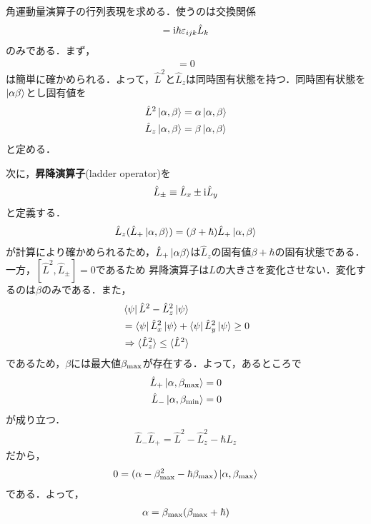 \documentclass{report}
\begin{document}
角運動量演算子の行列表現を求める．使うのは交換関係
\begin{align}
  [\hat{L}_i,\hat{L}_j] = \i\hbar\epsilon_{ijk}\hat{L}_k \label{commutation-of-am}
\end{align}
のみである．まず，
\begin{align}
  [\hat{L}^2, \hat{L}_i] = 0
\end{align}
は簡単に確かめられる．よって，$\hat{L}^2$と$\hat{L}_z$は同時固有状態を持つ．同時固有状態を$\ket{\alpha\beta}$とし固有値を
\begin{align}
  \hat{L}^2\ket{\alpha,\beta} &= \alpha\ket{\alpha,\beta}\\
  \hat{L}_z\ket{\alpha,\beta} &= \beta\ket{\alpha,\beta}
\end{align}
と定める．

次に，\textbf{昇降演算子}(ladder operator)を
\begin{align}
  \hat{L}_{\pm} \equiv \hat{L}_x \pm \mathrm{i} \hat{L}_y
\end{align}
と定義する．
\begin{align}
  \hat{L}_z(\hat{L}_{+}\ket{\alpha,\beta}) = (\beta + \hbar)\hat{L}_{+}\ket{\alpha,\beta}
\end{align}
が計算により確かめられるため，$\hat{L}_{+}\ket{\alpha\beta}$は$\hat{L}_z$の固有値$\beta+\hbar$の固有状態である．一方，$[\hat{L}^2, \hat{L}_{\pm}]=0$であるため
昇降演算子は$L$の大きさを変化させない．変化するのは$\beta$のみである．また，
\begin{align}
  &\bra{\psi}\hat{L}^2 - \hat{L}_z^2 \ket{\psi}\\
  &= \bra{\psi}\hat{L}_x^2\ket{\psi} + \bra{\psi}\hat{L}_y^2\ket{\psi} \geq 0\\
  &\Rightarrow \langle \hat{L}_z^2 \rangle \leq \langle \hat{L}^2 \rangle
\end{align}
であるため，$\beta$には最大値$\beta_{\mathrm{max}}$が存在する．よって，あるところで
\begin{align}
  \hat{L}_{+}\ket{\alpha,\beta_{\mathrm{max}}} &= 0\\
  \hat{L}_{-}\ket{\alpha,\beta_{\mathrm{min}}} &= 0
\end{align}
が成り立つ．
\begin{align}
  \hat{L}_{-}\hat{L}_{+} = \hat{L}^2 - \hat{L}_z^2 - \hbar \hat{L}_z
\end{align}
だから，
\begin{align}
  0 = (\alpha - \beta_{\mathrm{max}}^2 - \hbar \beta_{\mathrm{\max}})\ket{\alpha,\beta_{\mathrm{max}}}
\end{align}
である．よって，
\begin{align}
  \alpha = \beta_{\mathrm{max}}(\beta_{\mathrm{max}} + \hbar)
\end{align}
\end{document}
